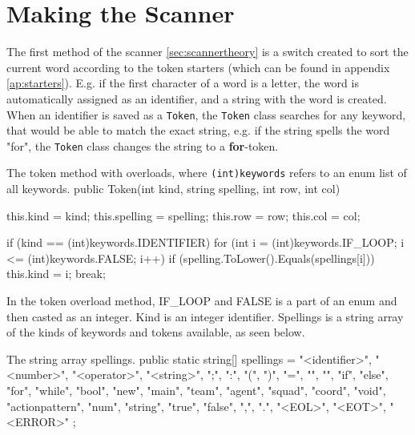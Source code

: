 \section{Making the Scanner}
The first method of the scanner \ref{sec:scannertheory} is a switch created to sort the current word according to the token starters (which can be found in appendix \ref{ap:starters}). E.g. if the first character of a word is a letter, the word is automatically assigned as an identifier, and a string with the word is created.\\
When an identifier is saved as a \texttt{Token}, the \texttt{Token} class searches for any keyword, that would be able to match the exact string, e.g. if the string spells the word "for", the \texttt{Token} class changes the string to a \textbf{for}-token.\\

\begin{source}{The token method with overloads, where \texttt{(int)keywords} refers to an enum list of all keywords.}{}
public Token(int kind, string spelling, int row, int col)
        {
            this.kind = kind;
            this.spelling = spelling;
            this.row = row;
            this.col = col;

            if (kind == (int)keywords.IDENTIFIER)
            {
                for (int i = (int)keywords.IF_LOOP; i <= (int)keywords.FALSE; i++)
                {
                    if (spelling.ToLower().Equals(spellings[i]))
                    {
                        this.kind = i;
                        break;
                    }
                }
            }
        }
\end{source}
In the token overload method, IF\_LOOP and FALSE is a part of an enum and then casted as an integer. Kind is an integer identifier. Spellings is a string array of the kinds of keywords and tokens available, as seen below.

\begin{source}{The string array spellings.}{}
public static string[] spellings = 
        {
            "<identifier>", "<number>", "<operator>", "<string>", ";", ":", "(", ")", "=", "{", "}", 
            "if", "else", "for", "while", "bool", "new", "main", "team", "agent", "squad", "coord", "void", 
            "actionpattern", "num", "string", "true", "false", ",", ".", "<EOL>", "<EOT>", "<ERROR>"                         
        };
\end{source}


